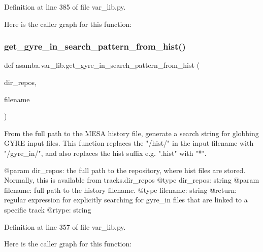 Definition at line 385 of file var\+\_\+lib.\+py.

Here is the caller graph for this function\+:
\mbox{\label{namespaceasamba_1_1var__lib_a6872a059696addcf6898489c86fb9458}} 
\subsubsection{\texorpdfstring{get\+\_\+gyre\+\_\+in\+\_\+search\+\_\+pattern\+\_\+from\+\_\+hist()}{get\_gyre\_in\_search\_pattern\_from\_hist()}}
{\footnotesize\ttfamily def asamba.\+var\+\_\+lib.\+get\+\_\+gyre\+\_\+in\+\_\+search\+\_\+pattern\+\_\+from\+\_\+hist (\begin{DoxyParamCaption}\item[{}]{dir\+\_\+repos,  }\item[{}]{filename }\end{DoxyParamCaption})}

\begin{DoxyVerb}From the full path to the MESA history file, generate a search string for globbing GYRE input files.
This function replaces the "/hist/" in the input filename with "/gyre_in/", and also replaces the 
hist suffix e.g. ".hist" with "*".

@param dir_repos: the full path to the repository, where hist files are stored. Normally, this is 
       available from tracks.dir_repos
@type dir_repos: string
@param filename: full path to the history filename. 
@type filename: string
@return: regular expression for explicitly searching for gyre_in files that are linked to a specific
      track
@rtype: string
\end{DoxyVerb}
 

Definition at line 357 of file var\+\_\+lib.\+py.

Here is the caller graph for this function\+:
\mbox{\label{namespaceasamba_1_1var__lib_a31c9bde7f3cc889b6f3bd873d002dbf1}} 

